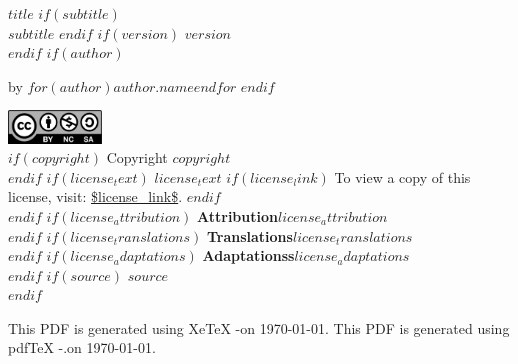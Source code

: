 \documentclass[10pt, letterpaper, titlepage, oneside, openright, final, article]{memoir}
\begin{document}
\frontmatter


%
%
\thispagestyle{empty}
\begin{flushleft}
    {\bfseries $title$}
    $if(subtitle)$
        {\\\itshape $subtitle$}
    $endif$
    $if(version)$
        \normalsize $version$\\
    $endif$
    $if(author)$

        \normalsize by $for(author)$$author.name$$endfor$
        \vspace*{1em}
    $endif$

    \vspace*{1.5em}

    \includegraphics[keepaspectratio=true, width=2.5cm]{cc_by_nc_sa_40.eps}\\[1.2em]
    $if(copyright)$
        \normalsize Copyright \textcopyright\space $copyright$\\[1.2em]
    $endif$
    $if(license_text)$
        {\normalsize $license_text$}
        $if(license_link)$
            {\normalsize To view a copy of this license, visit: \url{$license_link$}.}
        $endif$
        \\[1.2em]
    $endif$
    $if(license_attribution)$
        \normalsize {\bfseries Attribution}\textemdash $license_attribution$\\[1.2em]
    $endif$
    $if(license_translations)$
        \normalsize {\bfseries Translations}\textemdash $license_translations$\\[1.2em]
    $endif$
    $if(license_adaptations)$
        \normalsize {\bfseries Adaptationss}\textemdash $license_adaptations$\\[1.2em]
    $endif$
    $if(source)$
        \normalsize $source$\\[1.2em]
    $endif$

    \ifxetex
        \normalsize This PDF is generated using XeTeX \the\eTeXversion\eTeXrevision-\the\XeTeXversion\XeTeXrevision\space on \today.
    \else
        \normalsize This PDF is generated using pdfTeX \the\eTeXversion\eTeXrevision-\the\pdftexversion.\pdftexrevision\space on \today.
    \fi
\end{flushleft}
\pagebreak
\end{document}

